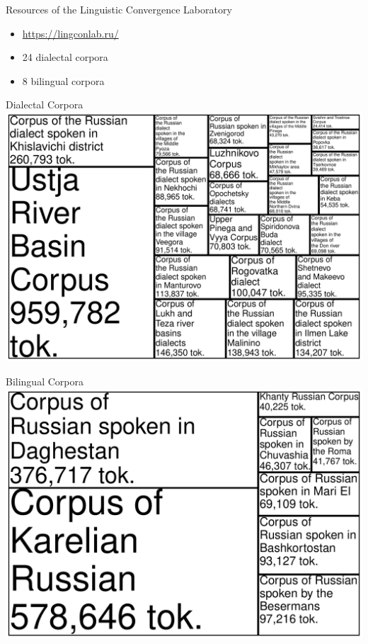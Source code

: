\documentclass[
  ignorenonframetext,
  t]{beamer}
\providecommand{\tightlist}{%
  \setlength{\itemsep}{0pt}\setlength{\parskip}{0pt}}\usepackage{longtable,booktabs,array}
\begin{document}
\begin{frame}{Resources of the Linguistic Convergence Laboratory}
\label{resources-of-the-linguistic-convergence-laboratory}
\begin{itemize}
\tightlist
\item
  \url{https://lingconlab.ru/}
\item
  24 dialectal corpora
\item
  8 bilingual corpora
\end{itemize}
\end{frame}

\begin{frame}{Dialectal Corpora}
\label{dialectal-corpora}
\includegraphics{2024.09.17_dial2_files/figure-beamer/unnamed-chunk-4-1.pdf}
\end{frame}

\begin{frame}{Bilingual Corpora}
\label{bilingual-corpora}
\includegraphics{2024.09.17_dial2_files/figure-beamer/unnamed-chunk-5-1.pdf}
\end{frame}
\end{document}

